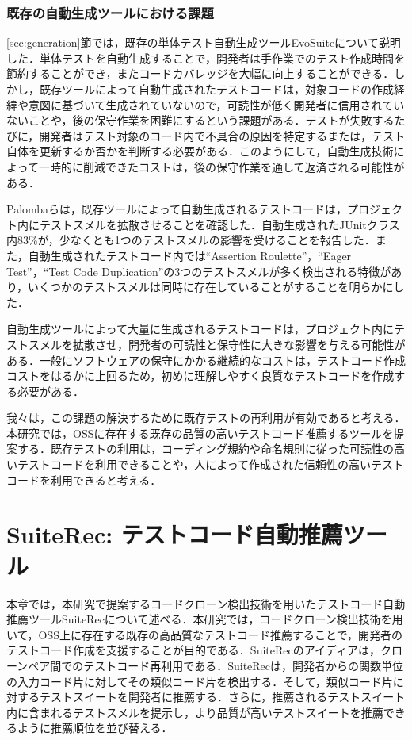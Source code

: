\documentclass[12pt]{jarticle} %
\begin{document}
\subsubsection{既存の自動生成ツールにおける課題}

\ref{sec:generation}節では，既存の単体テスト自動生成ツール{\sf EvoSuite}について説明した．単体テストを自動生成することで，開発者は手作業でのテスト作成時間を節約することができ，またコードカバレッジを大幅に向上することができる．しかし，既存ツールによって自動生成されたテストコードは，対象コードの作成経緯や意図に基づいて生成されていないので，可読性が低く開発者に信用されていないことや，後の保守作業を困難にするという課題がある\cite{b14,b15,b13}．テストが失敗するたびに，開発者はテスト対象のコード内で不具合の原因を特定するまたは，テスト自体を更新するか否かを判断する必要がある．このようにして，自動生成技術によって一時的に削減できたコストは，後の保守作業を通して返済される可能性がある\cite{b1}．

Palombaら\cite{Fabio2016}は，既存ツールによって自動生成されるテストコードは，プロジェクト内にテストスメルを拡散させることを確認した．自動生成されたJUnitクラス内83\%が，少なくとも1つのテストスメルの影響を受けることを報告した．また，自動生成されたテストコード内では``Assertion Roulette''，``Eager Test''，``Test Code Duplication''の3つのテストスメルが多く検出される特徴があり，いくつかのテストスメルは同時に存在していることがすることを明らかにした．

自動生成ツールによって大量に生成されるテストコードは，プロジェクト内にテストスメルを拡散させ，開発者の可読性と保守性に大きな影響を与える可能性がある．一般にソフトウェアの保守にかかる継続的なコストは，テストコード作成コストをはるかに上回るため，初めに理解しやすく良質なテストコードを作成する必要がある．

我々は，この課題の解決するために既存テストの再利用が有効であると考える．本研究では，OSSに存在する既存の品質の高いテストコード推薦するツールを提案する．既存テストの利用は，コーディング規約や命名規則に従った可読性の高いテストコードを利用できることや，人によって作成された信頼性の高いテストコードを利用できると考える．


\newpage
\section{SuiteRec: テストコード自動推薦ツール}

本章では，本研究で提案するコードクローン検出技術を用いたテストコード自動推薦ツール{\sf SuiteRec}について述べる．本研究では，コードクローン検出技術を用いて，OSS上に存在する既存の高品質なテストコード推薦することで，開発者のテストコード作成を支援することが目的である．{\sf SuiteRec}のアイディアは，クローンペア間でのテストコード再利用である．{\sf SuiteRec}は，開発者からの関数単位の入力コード片に対してその類似コード片を検出する．そして，類似コード片に対するテストスイートを開発者に推薦する．さらに，推薦されるテストスイート内に含まれるテストスメルを提示し，より品質が高いテストスイートを推薦できるように推薦順位を並び替える．
\end{document}

